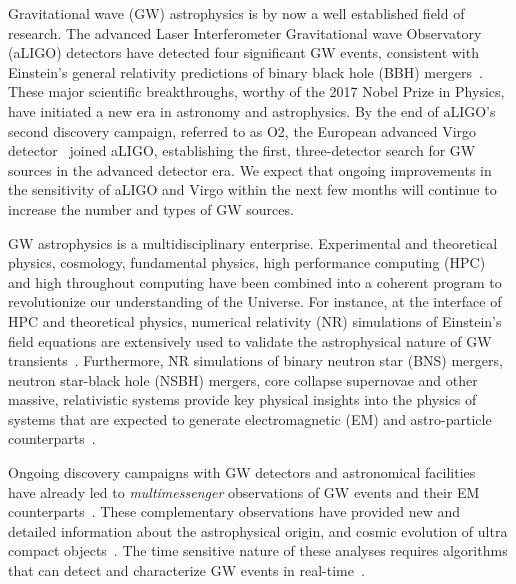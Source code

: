 \documentclass[aps,prd,%
amsmath,floats,floatfix, twocolumn, superscriptaddress,nofootinbib,showpacs]{revtex4-1}
\begin{document}
Gravitational wave (GW) astrophysics is by now a well established field of research. The advanced Laser Interferometer Gravitational wave Observatory (aLIGO) detectors have detected four significant GW events, consistent with Einstein's general relativity predictions of binary black hole (BBH) mergers~\cite{DI:2016,secondBBH:2016,bbhswithligo:2016,thirddetection}. These major scientific breakthroughs, worthy of the 2017 Nobel Prize in Physics, have initiated a new era in astronomy and astrophysics. By the end of aLIGO's second discovery campaign, referred to as O2, the European advanced Virgo detector~\cite{Virgo:2015} joined aLIGO, establishing the first, three-detector search for GW sources in the advanced detector era. We expect that ongoing improvements in the sensitivity of aLIGO and Virgo within the next few months will continue to increase the number and types of GW sources.

GW astrophysics is a multidisciplinary enterprise. Experimental and theoretical physics, cosmology, fundamental physics, high performance computing (HPC) and high throughout computing have been combined into a coherent program to revolutionize our understanding of the Universe. For instance, at the interface of HPC and theoretical physics, numerical relativity (NR) simulations of Einstein's field equations are extensively used to validate the astrophysical nature of GW transients~\cite{NRI:2016}. Furthermore, NR simulations of binary neutron star (BNS) mergers, neutron star-black hole (NSBH) mergers, core collapse supernovae and other massive, relativistic systems provide key physical insights into the physics of systems that are expected to generate electromagnetic (EM) and astro-particle counterparts~\cite{sum:2009CQGra,2014CQGra..31a5005M,2016PhRvD..93l4062H,2014PhRvD..90d4001A,2017JCoPh.335...84K,2013ApJ...767..124N}.

Ongoing discovery campaigns with GW detectors and astronomical facilities~\cite{DES:2016MNRAS,fermi:2013ApJS,LSST:2002SPIE,euclid:2013LRR,wfirst:2015JPhCS,D12:2016} have already led to \textit{multimessenger} observations of GW events and their EM counterparts~\cite{BNSdet:2017,scenarioligo:2016LRR,Singer:2014ApJ}. These complementary observations have provided new and detailed information about the astrophysical origin, and cosmic evolution of ultra compact objects~\cite{mma:2017,Eichler:1989,Paczynski:1986,Narayan:1992,Kochanek:1993mw,sum:2009CQGra,phi:2009astro2010S}. The time sensitive nature of these analyses requires algorithms that can detect and characterize GW events in real-time~\cite{2016ApJ...820....7L}. 
\end{document}
